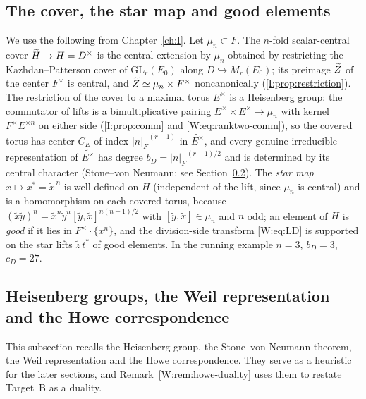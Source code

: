 \subsection{The cover, the star map and good elements}\label{W:subsec:coverbackground}
We use the following from Chapter~\ref{ch:I}.  Let $\mu_n\subset F$.  The
$n$-fold scalar-central cover $\widetilde H\to H=D^\times$ is the central
extension by $\mu_n$ obtained by restricting the Kazhdan--Patterson cover
of $\mathrm{GL}_r(E_0)$ \cite{KP84} along $D\hookrightarrow M_r(E_0)$; its
preimage $\widetilde Z$ of the center $F^\times$ is central, and
$\widetilde Z\simeq\mu_n\times F^\times$ noncanonically (\cref{I:prop:restriction}).  The
restriction of the cover to a maximal torus $E^\times$ is a Heisenberg
group: the commutator of lifts is a bimultiplicative pairing
$E^\times\times E^\times\to\mu_n$ with kernel $F^\times E^{\times n}$ on
either side (\cref{I:prop:comm} and \eqref{W:eq:ranktwo-comm}), so the
covered torus has center $C_E$ of index $|n|_F^{-(r-1)}$ in
$\widetilde{E^\times}$, and every genuine irreducible representation of
$\widetilde{E^\times}$ has degree $b_D=|n|_F^{-(r-1)/2}$ and is determined
by its central character (Stone--von Neumann; see
Section~\ref{W:subsec:howe}).  The \emph{star map} $x\mapsto x^*=\tilde x^{\,n}$
is well defined on $H$ (independent of the lift, since $\mu_n$ is
central) and is a homomorphism on each covered torus, because
$(\tilde x\tilde y)^n=\tilde x^n\tilde y^n[\tilde y,\tilde x]^{n(n-1)/2}$
with $[\tilde y,\tilde x]\in\mu_n$ and $n$ odd; an element of $H$ is \emph{good} if it
lies in $F^\times\cdot\{x^n\}$, and the division-side transform
\eqref{W:eq:LD} is supported on the star lifts $\tilde z\,t^*$ of good
elements.  In the running example $n=3$, $b_D=3$, $c_D=27$.

\subsection{Heisenberg groups, the Weil representation and the Howe correspondence}\label{W:subsec:howe}
This subsection recalls the Heisenberg group, the Stone--von Neumann theorem, the Weil representation and the Howe correspondence. They serve as a heuristic for the later sections, and Remark~\ref{W:rem:howe-duality} uses them to restate Target~B as a duality.

